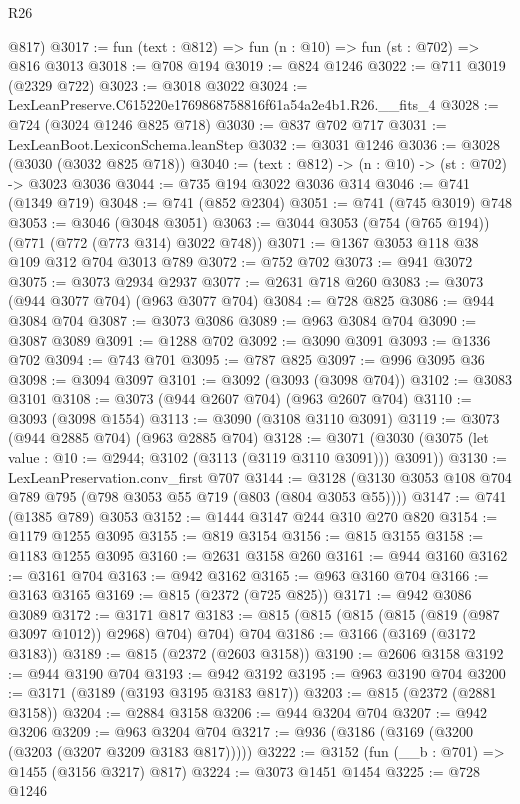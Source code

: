 \begin{lexlean}{R26}
\begin{coremodule}
      @817)
@3017 := fun (text : @812) => fun (n : @10) => fun (st : @702) => @816 @3013
@3018 := @708 @194
@3019 := @824 @1246
@3022 := @711 @3019 (@2329 @722)
@3023 := @3018 @3022
@3024 := LexLeanPreserve.C615220e1769868758816f61a54a2e4b1.R26.__fits_4
@3028 := @724 (@3024 @1246 @825 @718)
@3030 := @837 @702 @717
@3031 := LexLeanBoot.LexiconSchema.leanStep
@3032 := @3031 @1246
@3036 := @3028 (@3030 (@3032 @825 @718))
@3040 := (text : @812) -> (n : @10) -> (st : @702) -> @3023 @3036
@3044 := @735 @194 @3022 @3036 @314
@3046 := @741 (@1349 @719)
@3048 := @741 (@852 @2304)
@3051 := @741 (@745 @3019) @748
@3053 := @3046 (@3048 @3051)
@3063 := @3044 @3053 (@754 (@765 @194)) (@771 (@772 (@773 @314) @3022 @748))
@3071 := @1367 @3053 @118 @38 @109 @312 @704 @3013 @789
@3072 := @752 @702
@3073 := @941 @3072
@3075 := @3073 @2934 @2937
@3077 := @2631 @718 @260
@3083 := @3073 (@944 @3077 @704) (@963 @3077 @704)
@3084 := @728 @825
@3086 := @944 @3084 @704
@3087 := @3073 @3086
@3089 := @963 @3084 @704
@3090 := @3087 @3089
@3091 := @1288 @702
@3092 := @3090 @3091
@3093 := @1336 @702
@3094 := @743 @701
@3095 := @787 @825
@3097 := @996 @3095 @36
@3098 := @3094 @3097
@3101 := @3092 (@3093 (@3098 @704))
@3102 := @3083 @3101
@3108 := @3073 (@944 @2607 @704) (@963 @2607 @704)
@3110 := @3093 (@3098 @1554)
@3113 := @3090 (@3108 @3110 @3091)
@3119 := @3073 (@944 @2885 @704) (@963 @2885 @704)
@3128 := @3071 (@3030 (@3075 (let value : @10 := @2944; @3102 (@3113 (@3119 @3110 @3091))) @3091))
@3130 := LexLeanPreservation.conv_first @707
@3144 := @3128 (@3130 @3053 @108 @704 @789 @795 (@798 @3053 @55 @719 (@803 (@804 @3053 @55))))
@3147 := @741 (@1385 @789) @3053
@3152 := @1444 @3147 @244 @310 @270 @820
@3154 := @1179 @1255 @3095
@3155 := @819 @3154
@3156 := @815 @3155
@3158 := @1183 @1255 @3095
@3160 := @2631 @3158 @260
@3161 := @944 @3160
@3162 := @3161 @704
@3163 := @942 @3162
@3165 := @963 @3160 @704
@3166 := @3163 @3165
@3169 := @815 (@2372 (@725 @825))
@3171 := @942 @3086 @3089
@3172 := @3171 @817
@3183 := @815 (@815 (@815 (@815 (@819 (@987 @3097 @1012)) @2968) @704) @704) @704
@3186 := @3166 (@3169 (@3172 @3183))
@3189 := @815 (@2372 (@2603 @3158))
@3190 := @2606 @3158
@3192 := @944 @3190 @704
@3193 := @942 @3192
@3195 := @963 @3190 @704
@3200 := @3171 (@3189 (@3193 @3195 @3183 @817))
@3203 := @815 (@2372 (@2881 @3158))
@3204 := @2884 @3158
@3206 := @944 @3204 @704
@3207 := @942 @3206
@3209 := @963 @3204 @704
@3217 := @936 (@3186 (@3169 (@3200 (@3203 (@3207 @3209 @3183 @817)))))
@3222 := @3152 (fun (__b : @701) => @1455 (@3156 @3217) @817)
@3224 := @3073 @1451 @1454
@3225 := @728 @1246

\end{coremodule}
\end{lexlean}

